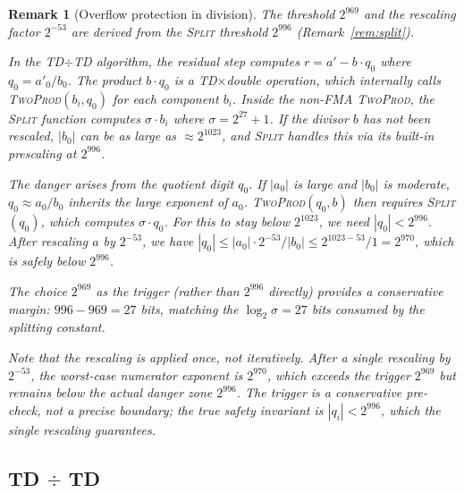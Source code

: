 \documentclass[11pt,a4paper]{article}
\newtheorem{remark}{Remark}
\begin{document}
\begin{remark}[Overflow protection in division]
\label{rem:threshold969}
The threshold $2^{969}$ and the rescaling factor $2^{-53}$ are
derived from the \textsc{Split} threshold $2^{996}$
(Remark~\ref{rem:split}).

In the TD$\div$TD algorithm, the residual step computes
$r = a' - b \cdot q_0$ where $q_0 = a'_0 / b_0$.  The product
$b \cdot q_0$ is a TD$\times$double operation, which internally
calls \textsc{TwoProd}$(b_i, q_0)$ for each component $b_i$.
Inside the non-FMA \textsc{TwoProd}, the \textsc{Split} function
computes $\sigma \cdot b_i$ where $\sigma = 2^{27} + 1$.  If the
divisor $b$ has not been rescaled, $|b_0|$ can be as large as
$\approx 2^{1023}$, and \textsc{Split} handles this via its
built-in prescaling at $2^{996}$.

The danger arises from the \emph{quotient digit} $q_0$.  If
$|a_0|$ is large and $|b_0|$ is moderate, $q_0 \approx a_0 / b_0$
inherits the large exponent of $a_0$.  \textsc{TwoProd}$(q_0, b)$
then requires \textsc{Split}$(q_0)$, which computes
$\sigma \cdot q_0$.  For this to stay below $2^{1023}$, we need
$|q_0| < 2^{996}$.  After rescaling $a$ by $2^{-53}$, we have
$|q_0| \le |a_0| \cdot 2^{-53} / |b_0| \le 2^{1023-53} / 1 =
2^{970}$, which is safely below $2^{996}$.

The choice $2^{969}$ as the trigger (rather than $2^{996}$ directly)
provides a conservative margin: $996 - 969 = 27$ bits, matching
the $\log_2 \sigma = 27$ bits consumed by the splitting constant.

Note that the rescaling is applied \emph{once}, not iteratively.
After a single rescaling by $2^{-53}$, the worst-case numerator
exponent is $2^{970}$, which exceeds the trigger $2^{969}$ but
remains below the actual danger zone $2^{996}$.  The trigger
is a conservative pre-check, not a precise boundary; the true
safety invariant is $|q_i| < 2^{996}$, which the single
rescaling guarantees.
\end{remark}

\subsection{TD $\div$ TD}
\end{document}
